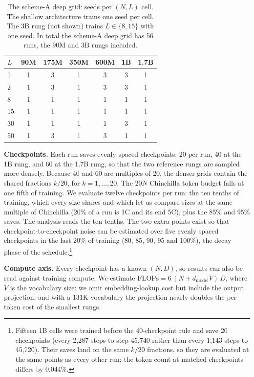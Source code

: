 \begin{table}[t]
\centering
\small
\caption{The scheme-A deep grid: seeds per $(N, L)$ cell. The shallow architecture trains one seed per cell. The 3B rung (not shown) trains $L \in \{8, 15\}$ with one seed. In total the scheme-A deep grid has 56 runs, the 90M and 3B rungs included.}
\label{tab:grid}
\begin{tabular}{lcccccc}
\toprule
$L$ & 90M & 175M & 350M & 600M & 1B & 1.7B \\
\midrule
1   & 1 & 3 & 1 & 3 & 3 & 1 \\
2   & 1 & 3 & 1 & 3 & 3 & 1 \\
8   & 1 & 1 & 1 & 1 & 1 & 1 \\
15  & 1 & 1 & 1 & 1 & 1 & 1 \\
30  & 1 & 1 & 1 & 1 & 3 & 1 \\
50  & 1 & 3 & 1 & 3 & 1 & 1 \\
\bottomrule
\end{tabular}
\end{table}

\textbf{Checkpoints.} Each run saves evenly spaced checkpoints: 20 per run, 40 at the 1B rung, and 60 at the 1.7B rung, so that the two reference rungs are sampled more densely. Because 40 and 60 are multiples of 20, the denser grids contain the shared fractions $k/20$, for $k=1,\ldots,20$. The $20N$ Chinchilla token budget falls at one fifth of training. We evaluate twelve checkpoints per run: the ten tenths of training, which every size shares and which let us compare sizes at the same multiple of Chinchilla (20\% of a run is 1C and its end 5C), plus the 85\% and 95\% saves. The analysis reads the ten tenths. The two extra points exist so that checkpoint-to-checkpoint noise can be estimated over five evenly spaced checkpoints in the last 20\% of training (80, 85, 90, 95 and 100\%), the decay phase of the schedule.\footnote{Fifteen 1B cells were trained before the 40-checkpoint rule and save 20 checkpoints (every 2,287 steps to step 45,740 rather than every 1,143 steps to 45,720). Their saves land on the same $k/20$ fractions, so they are evaluated at the same points as every other run; the token count at matched checkpoints differs by 0.044\%.}

\textbf{Compute axis.} Every checkpoint has a known $(N, D)$, so results can also be read against training compute. We estimate $\mathrm{FLOPs} = 6\,(N + d_{\mathrm{model}} V)\,D$, where $V$ is the vocabulary size: we omit embedding-lookup cost but include the output projection, and with a 131K vocabulary the projection nearly doubles the per-token cost of the smallest rungs.

